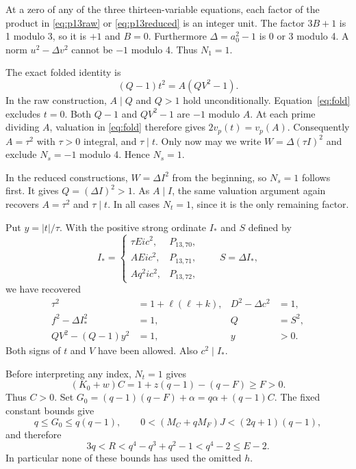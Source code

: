 \documentclass[11pt]{article}
\theoremstyle{remark}\newtheorem{remark}[theorem]{Remark}
\begin{document}
At a zero of any of the three thirteen-variable equations, each factor
of the product in \eqref{eq:p13raw} or \eqref{eq:p13reduced} is an integer
unit. The factor $3B+1$ is 1 modulo 3, so it is $+1$ and $B=0$.
Furthermore $\Delta=a_0^2-1$ is 0 or 3 modulo 4. A norm
$u^2-\Delta v^2$ cannot be $-1$ modulo 4. Thus $N_1=1$.

The exact folded identity is
\begin{equation}\label{eq:fold}
 (Q-1)t^2=A(QV^2-1).
\end{equation}
In the raw construction, $A\mid Q$ and $Q>1$ hold unconditionally.
Equation~\eqref{eq:fold} excludes $t=0$. Both $Q-1$ and $QV^2-1$
are $-1$ modulo $A$. At each prime dividing $A$, valuation in
\eqref{eq:fold} therefore gives
$2v_p(t)=v_p(A)$. Consequently $A=\tau^2$ with $\tau>0$ integral,
and $\tau\mid t$. Only now may we write
$W=\Delta(\tau I)^2$ and exclude $N_s=-1$ modulo 4. Hence $N_s=1$.

In the reduced constructions, $W=\Delta I^2$ from the beginning, so
$N_s=1$ follows first. It gives $Q=(\Delta I)^2>1$. As $A\mid I$,
the same valuation argument again recovers $A=\tau^2$ and $\tau\mid t$.
In all cases $N_t=1$, since it is the only remaining factor.

Put $y=|t|/\tau$. With the positive strong ordinate $I_*$ and $S$ defined by
\[
 I_*=
 \begin{cases}
   \tau Ei c^2,&P_{13,70},\\
   AEi c^2,&P_{13,71},\\
   Aq^2i c^2,&P_{13,72},
 \end{cases}
 \qquad S=\Delta I_*,
\]
we have recovered
\begin{align}
 \tau^2&=1+\ell(\ell+k),& D^2-\Delta c^2&=1,\label{eq:firstmain}\\
 f^2-\Delta I_*^2&=1,&Q&=S^2,\label{eq:strong}\\
 QV^2-(Q-1)y^2&=1,&y&>0.\label{eq:aux}
\end{align}
Both signs of $t$ and $V$ have been allowed. Also $c^2\mid I_*$.

Before interpreting any index, $N_t=1$ gives
\[
 (K_0+w)C=1+z(q-1)-(q-F)\ge F>0.
\]
Thus $C>0$. Set $G_0=(q-1)(q-F)+\alpha=q\alpha+(q-1)C$.
The fixed constant bounds give
\[
 q\le G_0\le q(q-1),\qquad
 0<(M_C+qM_F)J<(2q+1)(q-1),
\]
and therefore
\begin{equation}\label{eq:Rbounds}
 3q<R<q^4-q^3+q^2-1<q^4-2\le E-2.
\end{equation}
In particular none of these bounds has used the omitted $h$.
\end{document}
